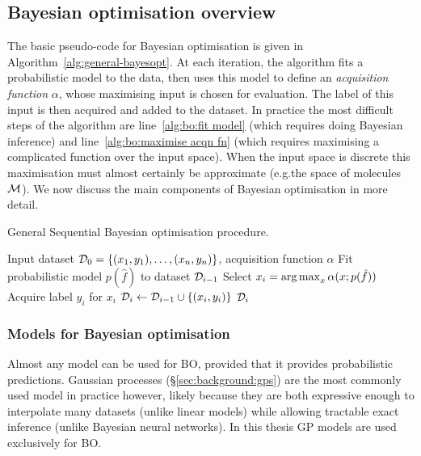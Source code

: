 \subsection{Bayesian optimisation overview}


The basic pseudo-code for Bayesian optimisation is given in Algorithm~\ref{alg:general-bayesopt}. 
At each iteration, the algorithm fits a probabilistic model to the data,
then uses this model to define an \emph{acquisition function} $\alpha$,
whose maximising input is chosen for evaluation.
The label of this input is then acquired and added to the dataset.
In practice the most difficult steps of the algorithm are
line~\ref{alg:bo:fit model} (which requires doing Bayesian inference)
and
line~\ref{alg:bo:maximise acqn fn} (which requires maximising a complicated function over the input space).
When the input space is discrete this maximisation must almost certainly be approximate (e.g.\@ the space of molecules $\mathcal{M}$).
We now discuss the main components of Bayesian optimisation in more detail.

\begin{algorithm}[htb]
\caption{General Sequential Bayesian optimisation procedure.}
\label{alg:general-bayesopt}
\begin{algorithmic}[1]
\REQUIRE Input dataset $\mathcal{D}_0=\{(x_1,y_1),\ldots,(x_n,y_n)\}$, acquisition function $\alpha$
    \STATE\label{alg:bo:fit model} Fit probabilistic model $p(\hat f)$ to dataset $\mathcal{D}_{i-1}$
    \STATE\label{alg:bo:maximise acqn fn} Select $x_i=\operatorname*{arg\,max}_{x} \alpha(x;p(\hat f))$\hfill%
    \STATE Acquire label $y_i$ for $x_i$
    \STATE $\mathcal{D}_i\gets \mathcal{D}_{i-1}\cup\{(x_i,y_i)\}$\hfill%
        \RETURN $\mathcal{D}_i$\hfill{}
    \ENDIF
\ENDFOR
\end{algorithmic}
\end{algorithm}

\subsubsection{Models for Bayesian optimisation}

Almost any model can be used for BO, provided that it provides probabilistic predictions.
Gaussian processes (\S\ref{sec:background:gps}) are the most commonly used model in practice however,
likely because they are both expressive enough to interpolate many datasets
(unlike linear models) while allowing tractable exact inference (unlike Bayesian neural networks).
In this thesis GP models are used exclusively for BO.

